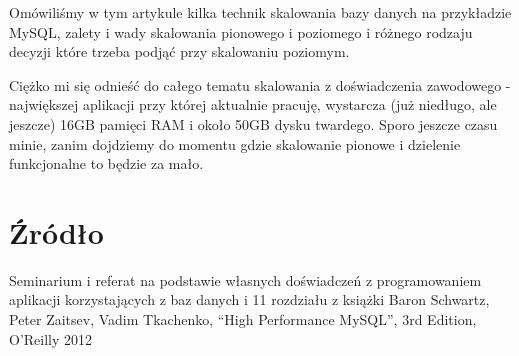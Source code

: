 \documentclass[a4paper,12pt]{article}
\begin{document}
Omówiliśmy w tym artykule kilka technik skalowania bazy danych na przykładzie MySQL, zalety i wady skalowania pionowego i poziomego i różnego rodzaju decyzji które trzeba podjąć przy skalowaniu poziomym.

Ciężko mi się odnieść do całego tematu skalowania z doświadczenia zawodowego - największej aplikacji przy której aktualnie pracuję, wystarcza (już niedługo, ale jeszcze) 16GB pamięci RAM i około 50GB dysku twardego. Sporo jeszcze czasu minie, zanim dojdziemy do momentu gdzie skalowanie pionowe i dzielenie funkcjonalne to będzie za mało.

\section{Źródło}

Seminarium i referat na podstawie własnych doświadczeń z programowaniem aplikacji korzystających z baz danych i 11 rozdziału z książki Baron Schwartz, Peter Zaitsev, Vadim Tkachenko, ``High Performance MySQL'', 3rd Edition, O'Reilly 2012
\end{document}
